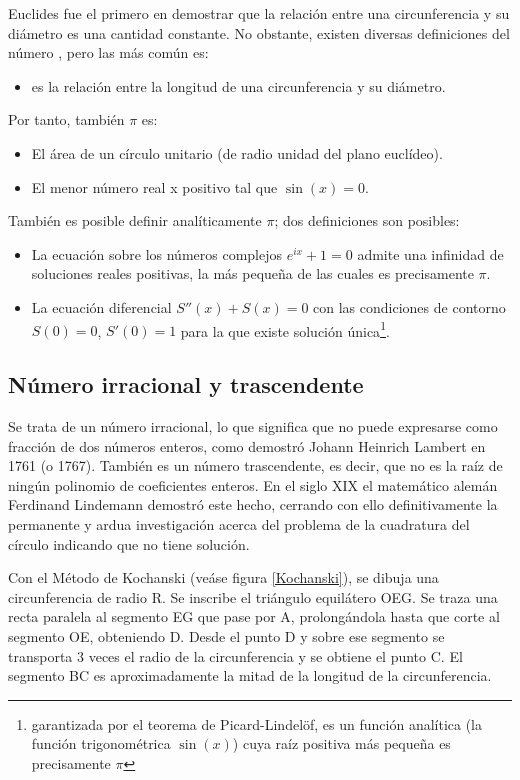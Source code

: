 \documentclass[spanish,a4paper,11pt]{article}
\begin{document}
Euclides fue el primero en demostrar que la relación entre una circunferencia y su diámetro es una cantidad constante\cite{Eucli}.
No obstante, existen diversas definiciones del número \PI, pero las más común es:

\begin{itemize}
\item \PI es la relación entre la longitud de una circunferencia y su diámetro.
\end{itemize}

Por tanto, también $\pi$ es:

\begin{itemize}
\item El área de un círculo unitario (de radio unidad del plano euclídeo).
\item El menor número real x positivo tal que $\sin(x) = 0$.
\end{itemize}

También es posible definir analíticamente $\pi$; dos definiciones son posibles:

\begin{itemize}
\item La ecuación sobre los números complejos $e^{ix}+1=0$ admite una infinidad de soluciones reales positivas, la más pequeña de las cuales es precisamente $\pi$.
\item La ecuación diferencial $S''(x)+S(x)=0$ con las condiciones de contorno $S(0)=0$, $S'(0)=1$ para la que existe solución única\footnote {garantizada por el teorema de
Picard-Lindelöf, es un función analítica (la función trigonométrica $\sin(x)$) cuya raíz positiva más pequeña es precisamente $\pi$}.
\end{itemize}



\subsection{Número irracional y trascendente}
Se trata de un número irracional, lo que significa que no puede expresarse como fracción de dos números enteros, como demostró Johann Heinrich Lambert
en 1761 (o 1767). También es un número trascendente, es decir, que no es la raíz de ningún polinomio de coeficientes enteros. En el siglo XIX el matemático
alemán Ferdinand Lindemann demostró este hecho, cerrando con ello definitivamente la permanente y ardua investigación acerca del problema de la cuadratura
del círculo indicando que no tiene solución.

Con el Método de Kochanski (veáse figura \ref{Kochanski}), se dibuja una circunferencia de radio R. Se inscribe el triángulo equilátero OEG. Se traza una
recta paralela al segmento EG que pase por A, prolongándola hasta que corte al segmento OE, obteniendo D. Desde el punto D y sobre ese segmento se transporta
3 veces el radio de la circunferencia y se obtiene el punto C. El segmento BC es aproximadamente la mitad de la longitud de la circunferencia.
\end{document}
